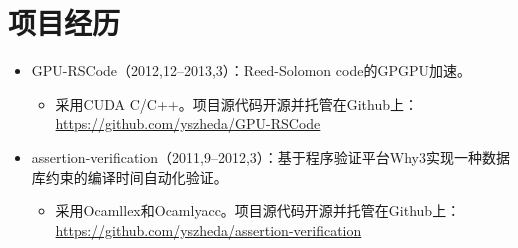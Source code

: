 \documentclass[letterpaper]{article}
\begin{document}
\section*{项目经历}
\begin{itemize}
    \item GPU-RSCode（2012,12--2013,3）：Reed-Solomon code的GPGPU加速。
        \begin{itemize}
            \item 采用CUDA C/C++。项目源代码开源并托管在Github上：\\
                \url{https://github.com/yszheda/GPU-RSCode}
        \end{itemize}
    \item assertion-verification（2011,9--2012,3）：基于程序验证平台Why3实现一种数据库约束的编译时间自动化验证。
        \begin{itemize}
            \item 采用Ocamllex和Ocamlyacc。项目源代码开源并托管在Github上：\\
                \url{https://github.com/yszheda/assertion-verification}
        \end{itemize}

\end{itemize}
\end{document}
